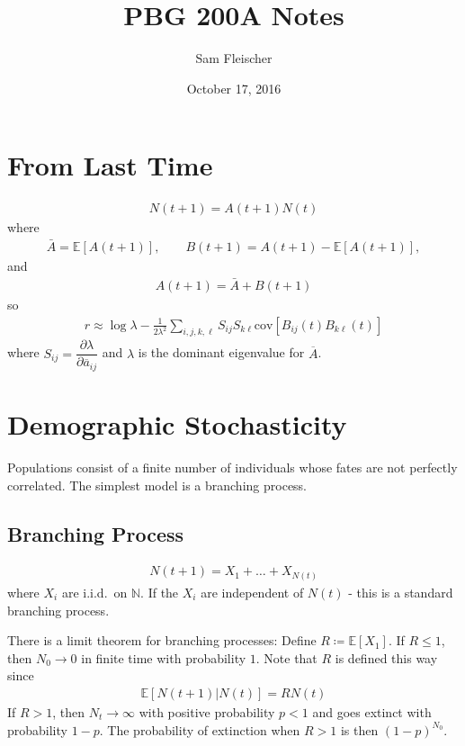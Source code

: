 \documentclass{article}
\title{PBG 200A Notes}
\author{Sam Fleischer}
\date{October 17, 2016}
\newcommand{\cov}{\text{cov}}
\newcommand{\expec}{\mathbb{E}}
\begin{document}
    \maketitle

    \section{From Last Time}
        \begin{align*}
            N(t+1) = A(t+1)N(t)
        \end{align*}
        where
        \begin{align*}
            \bar{A} = \expec[A(t+1)], \qquad B(t+1) = A(t+1) - \expec[A(t+1)],
        \end{align*}
        and
        \begin{align*}
            A(t+1) = \bar{A} + B(t+1)
        \end{align*}
        so
        \begin{align*}
            r \approx \log \lambda - \frac{1}{2\lambda^2}\sum_{i,j,k,\ell}S_{ij}S_{k\ell}\cov[B_{ij}(t)B_{k\ell}(t)]
        \end{align*}
        where $S_{ij} = \dfrac{\partial \lambda}{\partial \overline{a}_{ij}}$ and $\lambda$ is the dominant eigenvalue for $\overline{A}$.

    \section{Demographic Stochasticity}
        Populations consist of a finite number of individuals whose fates are not perfectly correlated.  The simplest model is a branching process.

        \subsection{Branching Process}
            \begin{align*}
                N(t+1) = X_1 + \dots + X_{N(t)}
            \end{align*}
            where $X_i$ are i.i.d.~on $\mathbb{N}$.  If the $X_i$ are independent of $N(t)$ - this is a standard branching process.

            There is a limit theorem for branching processes: Define $R \coloneqq \expec[X_1]$.  If $R \leq 1$, then $N_0 \rightarrow 0$ in finite time with probability $1$.  Note that $R$ is defined this way since
            \begin{align*}
                \expec[N(t+1)|N(t)] = RN(t)
            \end{align*}
            If $R > 1$, then $N_t \rightarrow \infty$ with positive probability $p<1$ and goes extinct with probability $1 - p$.  The probability of extinction when $R>1$ is then $(1 - p)^{N_0}$.
\end{document}
